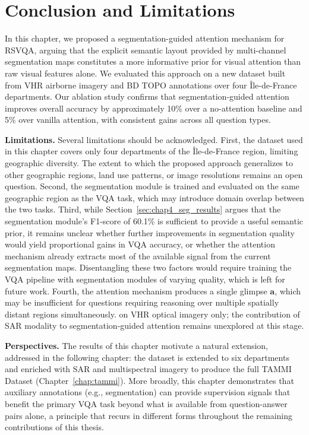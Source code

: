 \section{Conclusion and Limitations}
\label{sec:chap4_conclusion}

In this chapter, we proposed a segmentation-guided
attention mechanism for RSVQA, arguing that the explicit
semantic layout provided by multi-channel segmentation
maps constitutes a more informative prior for visual
attention than raw visual features alone. We evaluated
this approach on a new dataset built from VHR airborne
imagery and BD TOPO annotations over four Île-de-France
departments. Our ablation study confirms that
segmentation-guided attention improves overall accuracy
by approximately 10\% over a no-attention baseline and
5\% over vanilla attention, with consistent gains across
all question types.

\textbf{Limitations.}
Several limitations should be acknowledged. First, the
dataset used in this chapter covers only four
departments of the Île-de-France region, limiting
geographic diversity. The extent to which the proposed
approach generalizes to other geographic regions, land
use patterns, or image resolutions remains an open
question. Second, the segmentation module is trained and
evaluated on the same geographic region as the VQA task,
which may introduce domain overlap between the two
tasks. Third, while Section~\ref{sec:chap4_seg_results} argues
that the segmentation module's F1-score of 60.1\% is
sufficient to provide a useful semantic prior, it remains
unclear whether further improvements in segmentation
quality would yield proportional gains in VQA accuracy,
or whether the attention mechanism already extracts most
of the available signal from the current segmentation
maps. Disentangling these two factors would require
training the VQA pipeline with segmentation modules of
varying quality, which is left for future work. Fourth, the attention mechanism produces a
single glimpse $\mathbf{a}$, which may be insufficient
for questions requiring reasoning over multiple spatially
distant regions simultaneously. %
on VHR optical imagery only; the contribution of SAR
modality to segmentation-guided attention remains
unexplored at this stage.

\textbf{Perspectives.}
The results of this chapter motivate a natural extension,
addressed in the following chapter: the dataset is
extended to six departments and enriched with SAR and multispectral
imagery to produce the full TAMMI Dataset
(Chapter~\ref{chap:tammi}). More broadly, this chapter
demonstrates that auxiliary annotations (e.g., segmentation)
can provide supervision signals that
benefit the primary VQA task beyond what is available
from question-answer pairs alone, a principle that
recurs in different forms throughout the remaining
contributions of this thesis.

